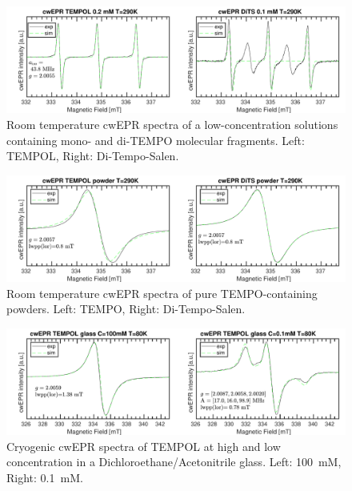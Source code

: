 \begin{figure}[h]
\center
	\includegraphics[width=1\textwidth]{./operando_epr/figures/TEMPOL/cwEPR_TEMPOL_vs_DiTS_RT.pdf}
	\caption{Room temperature cwEPR spectra of a low-concentration solutions containing mono- and di-TEMPO molecular fragments. Left: TEMPOL, Right: Di-Tempo-Salen.}
	\label{fig:cwEPR_monoTEMPO_diTEMPO_SOLUTION}
\end{figure}
\begin{figure}[h]
\center
	\includegraphics[width=1\textwidth]{./operando_epr/figures/TEMPOL/cwEPR_TEMPOL_vs_DiTS_RT_POWDER.pdf}
	\caption{Room temperature cwEPR spectra of pure TEMPO-containing powders. Left: TEMPO, Right: Di-Tempo-Salen.}
	\label{fig:cwEPR_monoTEMPO_diTEMPO_POWDER}
\end{figure}

\begin{figure}[h]
\center
	\includegraphics[width=1\textwidth]{./operando_epr/figures/TEMPOL/cwEPR_TEMPOL_100mM_vs_p1mM_80K.pdf}
	\caption{Cryogenic cwEPR spectra of TEMPOL at high and low concentration in a Dichloroethane/Acetonitrile glass. Left: 100~mM, Right: 0.1~mM.}
	\label{fig:cwEPR_TEMPOL_High_Low_Concentrations}
\end{figure}



